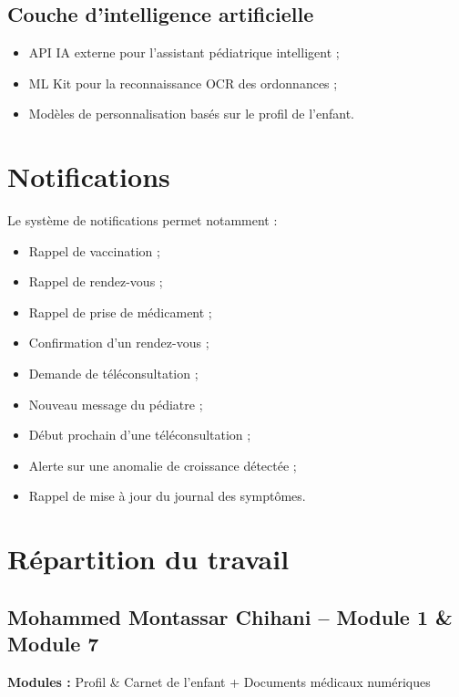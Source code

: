 \documentclass[11pt,a4paper]{article}
\begin{document}
\subsection{Couche d'intelligence artificielle}
\begin{itemize}
  \item API IA externe pour l'assistant pédiatrique intelligent ;
  \item ML Kit pour la reconnaissance OCR des ordonnances ;
  \item Modèles de personnalisation basés sur le profil de l'enfant.
\end{itemize}

\section{Notifications}

Le système de notifications permet notamment :

\begin{itemize}
  \item Rappel de vaccination ;
  \item Rappel de rendez-vous ;
  \item Rappel de prise de médicament ;
  \item Confirmation d'un rendez-vous ;
  \item Demande de téléconsultation ;
  \item Nouveau message du pédiatre ;
  \item Début prochain d'une téléconsultation ;
  \item Alerte sur une anomalie de croissance détectée ;
  \item Rappel de mise à jour du journal des symptômes.
\end{itemize}

\section{Répartition du travail}

\subsection{Mohammed Montassar Chihani -- Module 1 \& Module 7}

\textbf{Modules :} Profil \& Carnet de l'enfant + Documents médicaux numériques
\end{document}
